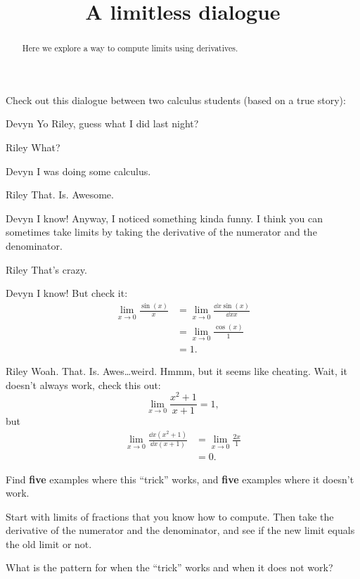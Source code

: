 \documentclass{ximera}
\title[Break-Ground:]{A limitless dialogue}
\begin{document}
\begin{abstract}
Here we explore a way to compute limits using derivatives.
\end{abstract}
\maketitle

Check out this dialogue between two calculus students (based on a true
story):

\begin{dialogue}
\item[Devyn] Yo Riley, guess what I did last night?
\item[Riley] What?
\item[Devyn] I was doing some calculus.
\item[Riley] That. Is. Awesome.
\item[Devyn] I know! Anyway, I noticed something kinda funny. I
  think you can sometimes take limits by taking the derivative of the
  numerator and the denominator.
\item[Riley] That's crazy.
\item[Devyn] I know! But check it:
  \begin{align*}
    \lim_{x\to 0} \frac{\sin(x)}{x} &= \lim_{x\to 0} \frac{\dd{x}\sin(x)}{\dd{x}x}\\
    &= \lim_{x\to 0} \frac{\cos(x)}{1}\\
    &=1.
  \end{align*}
  \item[Riley] Woah. That. Is. Awes\dots weird. Hmmm, but it seems like
    cheating. Wait, it doesn't always work, check this out:
    \[
    \lim_{x\to 0} \frac{x^2+1}{x+1} = 1,
    \]
    but
    \begin{align*}
      \lim_{x\to 0} \frac{\dd{x}\left(x^2+1\right)}{\dd{x}\left(x+1\right)} &=
      \lim_{x\to 0} \frac{2x}{1} \\
      &=0.
    \end{align*}
\end{dialogue}

\begin{problem}
  Find \textbf{five} examples where this ``trick'' works, and
  \textbf{five} examples where it doesn't work.
  \begin{hint}
    Start with limits of fractions that you know how to compute. Then
    take the derivative of the numerator and the denominator, and see
    if the new limit equals the old limit or not.
  \end{hint}
  \begin{freeResponse}
  \end{freeResponse}
\end{problem}

\begin{problem}
  What is the pattern for when the ``trick'' works and when it does not work?
  \begin{freeResponse}
\end{freeResponse}
\end{problem}

\end{document}
